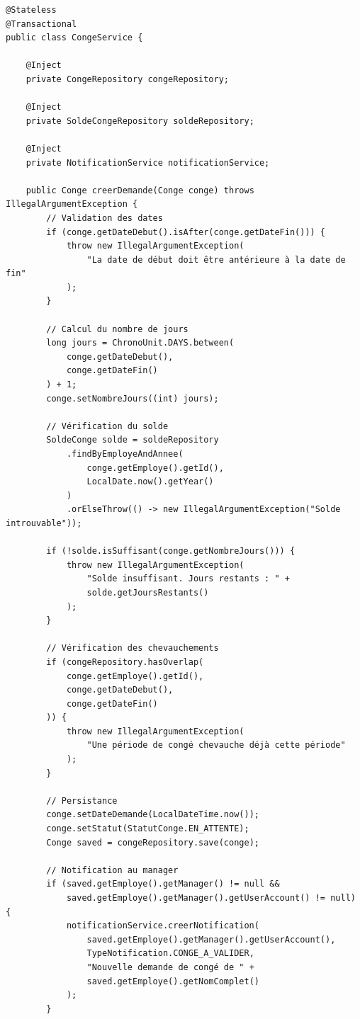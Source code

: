 \documentclass[12pt,a4paper,twoside]{report}
\begin{document}
\begin{lstlisting}[caption=Service EJB avec validation métier, label=lst:ejb-service]
@Stateless
@Transactional
public class CongeService {
    
    @Inject
    private CongeRepository congeRepository;
    
    @Inject
    private SoldeCongeRepository soldeRepository;
    
    @Inject
    private NotificationService notificationService;
    
    public Conge creerDemande(Conge conge) throws IllegalArgumentException {
        // Validation des dates
        if (conge.getDateDebut().isAfter(conge.getDateFin())) {
            throw new IllegalArgumentException(
                "La date de début doit être antérieure à la date de fin"
            );
        }
        
        // Calcul du nombre de jours
        long jours = ChronoUnit.DAYS.between(
            conge.getDateDebut(), 
            conge.getDateFin()
        ) + 1;
        conge.setNombreJours((int) jours);
        
        // Vérification du solde
        SoldeConge solde = soldeRepository
            .findByEmployeAndAnnee(
                conge.getEmploye().getId(), 
                LocalDate.now().getYear()
            )
            .orElseThrow(() -> new IllegalArgumentException("Solde introuvable"));
        
        if (!solde.isSuffisant(conge.getNombreJours())) {
            throw new IllegalArgumentException(
                "Solde insuffisant. Jours restants : " + 
                solde.getJoursRestants()
            );
        }
        
        // Vérification des chevauchements
        if (congeRepository.hasOverlap(
            conge.getEmploye().getId(),
            conge.getDateDebut(),
            conge.getDateFin()
        )) {
            throw new IllegalArgumentException(
                "Une période de congé chevauche déjà cette période"
            );
        }
        
        // Persistance
        conge.setDateDemande(LocalDateTime.now());
        conge.setStatut(StatutConge.EN_ATTENTE);
        Conge saved = congeRepository.save(conge);
        
        // Notification au manager
        if (saved.getEmploye().getManager() != null && 
            saved.getEmploye().getManager().getUserAccount() != null) {
            notificationService.creerNotification(
                saved.getEmploye().getManager().getUserAccount(),
                TypeNotification.CONGE_A_VALIDER,
                "Nouvelle demande de congé de " + 
                saved.getEmploye().getNomComplet()
            );
        }
        

\end{lstlisting}
\end{document}

